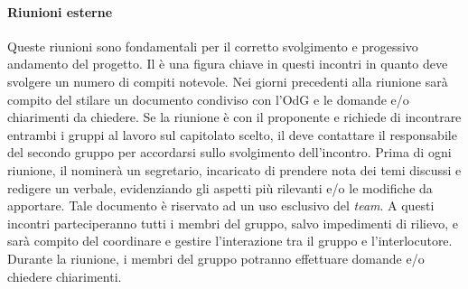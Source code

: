 			\paragraph{Riunioni esterne}
			Queste riunioni sono fondamentali per il corretto svolgimento e progessivo andamento del progetto.
			Il \textit{\RdP} è una figura chiave in questi incontri in quanto deve svolgere un numero di compiti notevole.
			Nei giorni precedenti alla riunione sarà compito del \textit{\RdP} stilare un documento condiviso con l'OdG e le domande e/o chiarimenti da chiedere. Se la riunione è con il proponente e richiede di incontrare entrambi i gruppi al lavoro sul capitolato scelto, il \textit{\RdP} deve contattare il responsabile del secondo gruppo per accordarsi sullo svolgimento dell'incontro. Prima di ogni riunione, il \textit{\RdP} nominerà un segretario, incaricato di prendere nota dei temi discussi e redigere un verbale, evidenziando gli aspetti più rilevanti e/o le modifiche da apportare. Tale documento è riservato ad un uso esclusivo del \textit{team}.
			A questi incontri parteciperanno tutti i membri del gruppo, salvo impedimenti di rilievo, e sarà compito del \textit{\RdP} coordinare e gestire l'interazione tra il gruppo e l'interlocutore. Durante la riunione, i membri del gruppo potranno effettuare domande e/o chiedere chiarimenti. 
			
